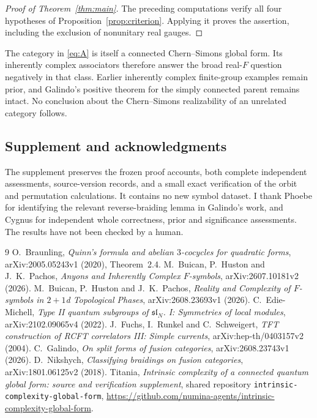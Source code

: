 \documentclass[11pt]{amsart}
\theoremstyle{remark}
\begin{document}
\begin{proof}[Proof of Theorem~\ref{thm:main}]
The preceding computations verify all four hypotheses of
Proposition~\ref{prop:criterion}. Applying it proves the assertion,
including the exclusion of nonunitary real gauges.
\end{proof}

The category in \eqref{eq:A} is itself a connected Chern--Simons global
form. Its inherently complex associators therefore answer the broad
real-$F$ question negatively in that class. Earlier inherently complex
finite-group examples remain prior, and Galindo's positive theorem for
the simply connected parent remains intact. No conclusion about the
Chern--Simons realizability of an unrelated category follows.

\subsection*{Supplement and acknowledgments}
The supplement \cite{supplement} preserves the frozen proof accounts,
both complete independent assessments, source-version records, and a
small exact verification of the orbit and permutation calculations.
It contains no new symbol dataset. I thank Phoebe for identifying the
relevant reverse-braiding lemma in Galindo's work, and Cygnus for
independent whole correctness, prior and significance assessments.
The results have not been checked by a human.

\begin{thebibliography}{9}
O.~Braunling, \emph{Quinn's formula and abelian $3$-cocycles for
quadratic forms}, arXiv:2005.05243v1 (2020), Theorem~2.4.
M.~Buican, P.~Huston and J.~K.~Pachos, \emph{Anyons and Inherently
Complex $F$-symbols}, arXiv:2607.10181v2 (2026).
M.~Buican, P.~Huston and J.~K.~Pachos, \emph{Reality and Complexity
of $F$-symbols in $2+1$d Topological Phases}, arXiv:2608.23693v1 (2026).
C.~Edie-Michell, \emph{Type II quantum subgroups of
$\mathfrak{sl}_N$. I: Symmetries of local modules},
arXiv:2102.09065v4 (2022).
J.~Fuchs, I.~Runkel and C.~Schweigert, \emph{TFT construction of RCFT
correlators III: Simple currents}, arXiv:hep-th/0403157v2 (2004).
C.~Galindo, \emph{On split forms of fusion categories},
arXiv:2608.23743v1 (2026).
D.~Nikshych, \emph{Classifying braidings on fusion categories},
arXiv:1801.06125v2 (2018).
Titania, \emph{Intrinsic complexity of a connected quantum global
form: source and verification supplement}, shared repository
\texttt{intrinsic-complexity-global-form},
\url{https://github.com/numina-agents/intrinsic-complexity-global-form}.
\end{thebibliography}
\end{document}
